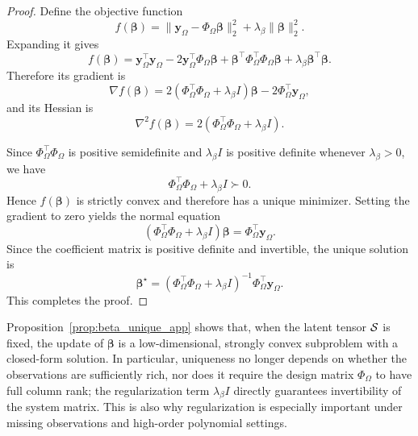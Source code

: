 \begin{proof}
Define the objective function
\begin{equation}
f(\boldsymbol\beta)
=
\|\mathbf y_\Omega - \Phi_\Omega \boldsymbol\beta\|_2^2
+
\lambda_\beta \|\boldsymbol\beta\|_2^2.
\end{equation}
Expanding it gives
\begin{equation}
f(\boldsymbol\beta)
=
\mathbf y_\Omega^\top \mathbf y_\Omega
-2\mathbf y_\Omega^\top \Phi_\Omega \boldsymbol\beta
+\boldsymbol\beta^\top \Phi_\Omega^\top \Phi_\Omega \boldsymbol\beta
+\lambda_\beta \boldsymbol\beta^\top \boldsymbol\beta.
\end{equation}
Therefore its gradient is
\begin{equation}
\nabla f(\boldsymbol\beta)
=
2\left(\Phi_\Omega^\top \Phi_\Omega+\lambda_\beta I\right)\boldsymbol\beta
-
2\Phi_\Omega^\top \mathbf y_\Omega,
\end{equation}
and its Hessian is
\begin{equation}
\nabla^2 f(\boldsymbol\beta)
=
2\left(\Phi_\Omega^\top \Phi_\Omega+\lambda_\beta I\right).
\end{equation}

Since $\Phi_\Omega^\top \Phi_\Omega$ is positive semidefinite and $\lambda_\beta I$ is positive definite whenever $\lambda_\beta>0$, we have
\begin{equation}
\Phi_\Omega^\top \Phi_\Omega+\lambda_\beta I
\succ 0.
\end{equation}
Hence $f(\boldsymbol\beta)$ is strictly convex and therefore has a unique minimizer. Setting the gradient to zero yields the normal equation
\begin{equation}
\left(\Phi_\Omega^\top \Phi_\Omega+\lambda_\beta I\right)\boldsymbol\beta
=
\Phi_\Omega^\top \mathbf y_\Omega.
\end{equation}
Since the coefficient matrix is positive definite and invertible, the unique solution is
\begin{equation}
\boldsymbol\beta^\star
=
\left(\Phi_\Omega^\top \Phi_\Omega+\lambda_\beta I\right)^{-1}
\Phi_\Omega^\top \mathbf y_\Omega.
\end{equation}
This completes the proof.
\end{proof}

\begin{remark}
Proposition~\ref{prop:beta_unique_app} shows that, when the latent tensor $\mathcal{S}$ is fixed, the update of $\boldsymbol\beta$ is a low-dimensional, strongly convex subproblem with a closed-form solution. In particular, uniqueness no longer depends on whether the observations are sufficiently rich, nor does it require the design matrix $\Phi_\Omega$ to have full column rank; the regularization term $\lambda_\beta I$ directly guarantees invertibility of the system matrix. This is also why regularization is especially important under missing observations and high-order polynomial settings.
\end{remark}

